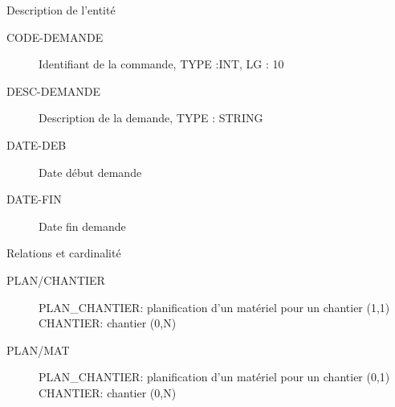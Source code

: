\par{Description de l'entité}
\begin{description}
    \item[CODE-DEMANDE] Identifiant de la commande, TYPE :INT, LG : 10
    \item[DESC-DEMANDE] Description de la demande, TYPE : STRING 
    \item[DATE-DEB]     Date début demande
    \item[DATE-FIN]     Date fin demande
\end{description}

\par{Relations et cardinalité}
\begin{description}
    \item[PLAN/CHANTIER]\el
        PLAN\_CHANTIER: planification d'un matériel pour un chantier (1,1)\el
        CHANTIER: chantier (0,N)
    \item[PLAN/MAT]\el
        PLAN\_CHANTIER: planification d'un matériel pour un chantier (0,1)\el
        CHANTIER: chantier (0,N)
\end{description}

